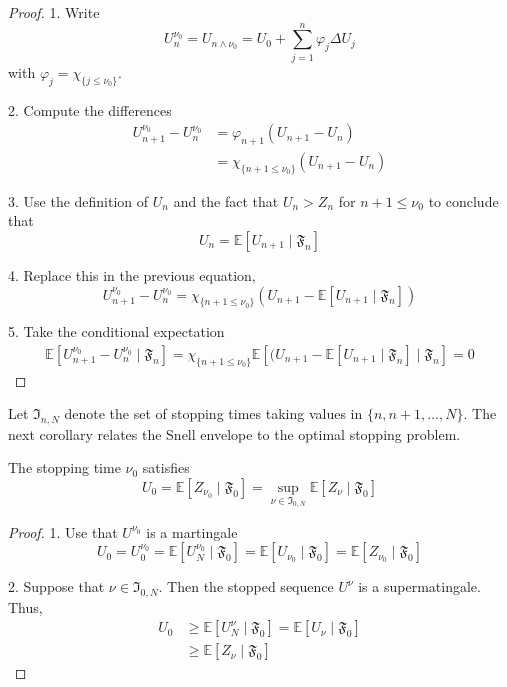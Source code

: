 \begin{proof}
    1. Write 
    \[
        U_n^{\nu_0} = U_{n \wedge \nu_0} = U_0 + \sum_{j=1}^{n} \varphi_j \Delta U_j
    \]
    with $\varphi_j = \chi_{\{j \le \nu_0\}}$.

    2. Compute the differences 
    \begin{equation*}
        \begin{aligned}
            U_{n+1}^{\nu_0} - U_n^{\nu_0} &= \varphi_{n+1} (U_{n+1} - U_n) \\
            &= \chi_{\{n+1 \le \nu_0\}} (U_{n+1} - U_n)
        \end{aligned}
    \end{equation*}

    3. Use the definition of $U_n$ and the fact that $U_n > Z_n$ for $n+1 \le \nu_0$ to conclude that 
    \[
        U_n = \mathbb{E}[U_{n+1} \mid \mathfrak{F}_n]
    \]

    4. Replace this in the previous equation, 
    \[
        U_{n+1}^{\nu_0} - U_n^{\nu_0} = \chi_{\{n+1 \le \nu_0\}} (U_{n+1} - \mathbb{E}[U_{n+1} \mid \mathfrak{F}_n])
    \]

    5. Take the conditional expectation 
    \begin{equation*}
        \begin{aligned}
            \mathbb{E}[U_{n+1}^{\nu_0} - U_n^{\nu_0} \mid \mathfrak{F}_n] = \chi_{\{n+1 \le \nu_0\}} \mathbb{E}[(U_{n+1} - \mathbb{E}[U_{n+1} \mid \mathfrak{F}_n] \mid \mathfrak{F}_n] = 0
        \end{aligned}
    \end{equation*}
\end{proof}

Let $\mathfrak{I}_{n, N}$ denote the set of stopping times taking values in $\{n, n+1, \ldots, N\}$. The next corollary relates the Snell envelope to the optimal stopping problem.

\begin{corollary}\label{cor:2.2.2}
    The stopping time $\nu_0$ satisfies 
    \[
        U_0 = \mathbb{E}[Z_{\nu_0} \mid \mathfrak{F}_0] = \sup_{\nu \in \mathfrak{I}_{0, N}} \mathbb{E}[Z_{\nu} \mid \mathfrak{F}_0]
    \]
\end{corollary}

\begin{proof}
    1. Use that $U^{\nu_0}$ is a martingale
    \[
        U_0 = U_0^{\nu_0} = \mathbb{E}[U_N^{\nu_0} \mid \mathfrak{F}_0] = \mathbb{E}[U_{\nu_0} \mid \mathfrak{F}_0] = \mathbb{E}[Z_{\nu_0} \mid \mathfrak{F}_0]
    \]

    2. Suppose that $\nu \in \mathfrak{I}_{0, N}$. Then the stopped sequence $U^\nu$ is a supermatingale. Thus, 
    \begin{equation*}
        \begin{aligned}
            U_0 &\ge \mathbb{E}[U_N^\nu \mid \mathfrak{F}_0] = \mathbb{E}[U_\nu \mid \mathfrak{F}_0] \\
            &\ge \mathbb{E}[Z_\nu \mid \mathfrak{F}_0]
        \end{aligned}
    \end{equation*}
\end{proof}

